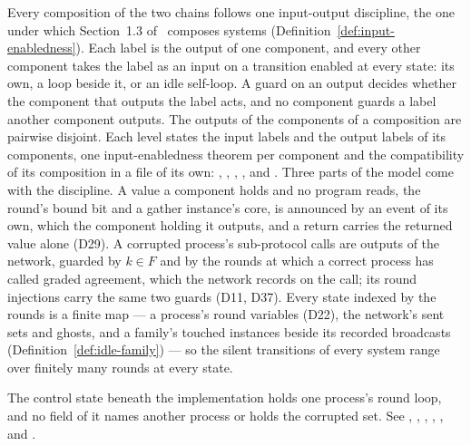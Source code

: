 Every composition of the two chains follows one input-output discipline, the one under which Section~1.3 of~\cite{LeslieBP} composes systems (Definition~\ref{def:input-enabledness}).
Each label is the output of one component, and every other component takes the label as an input on a transition enabled at every state: its own, a loop beside it, or an idle self-loop.
A guard on an output decides whether the component that outputs the label acts, and no component guards a label another component outputs.
The outputs of the components of a composition are pairwise disjoint.
Each level states the input labels and the output labels of its components, one input-enabledness theorem per component and the compatibility of its composition in a file of its own: , , , ,  and .
Three parts of the model come with the discipline.
A value a component holds and no program reads, the round's bound bit and a gather instance's core, is announced by an event of its own, which the component holding it outputs, and a return carries the returned value alone (D29).
A corrupted process's sub-protocol calls are outputs of the network, guarded by $k \in F$ and by the rounds at which a correct process has called graded agreement, which the network records on the call; its round injections carry the same two guards (D11, D37).
Every state indexed by the rounds is a finite map --- a process's round variables (D22), the network's sent sets and ghosts, and a family's touched instances beside its recorded broadcasts (Definition~\ref{def:idle-family}) --- so the silent transitions of every system range over finitely many rounds at every state.

The control state beneath the implementation holds one process's round loop, and no field of it names another process or holds the corrupted set.
See , , , , ,  and .

